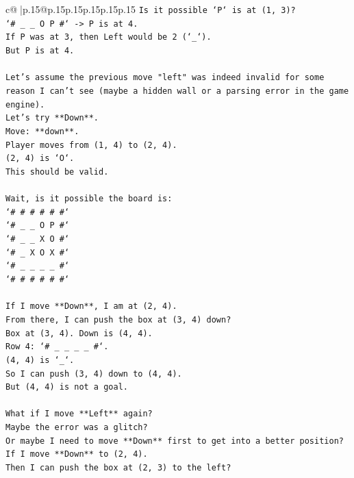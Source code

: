 \documentclass{article}
\begin{document}
{\begin{supertabular}{c@{$\;$}|p{.15\linewidth}@{}p{.15\linewidth}p{.15\linewidth}p{.15\linewidth}p{.15\linewidth}p{.15\linewidth}}
{{{\texttt{Is it possible `P` is at (1, 3)?} \\
\texttt{`\# \_ \_ O P \#` {-}> P is at 4.} \\
\texttt{If P was at 3, then Left would be 2 (`\_`).} \\
\texttt{But P is at 4.} \\
\\ 
\texttt{Let's assume the previous move "left" was indeed invalid for some reason I can't see (maybe a hidden wall or a parsing error in the game engine).} \\
\texttt{Let's try **Down**.} \\
\texttt{Move: **down**.} \\
\texttt{Player moves from (1, 4) to (2, 4).} \\
\texttt{(2, 4) is `O`.} \\
\texttt{This should be valid.} \\
\\ 
\texttt{Wait, is it possible the board is:} \\
\texttt{`\# \# \# \# \# \#`} \\
\texttt{`\# \_ \_ O P \#`} \\
\texttt{`\# \_ \_ X O \#`} \\
\texttt{`\# \_ X O X \#`} \\
\texttt{`\# \_ \_ \_ \_ \#`} \\
\texttt{`\# \# \# \# \# \#`} \\
\\ 
\texttt{If I move **Down**, I am at (2, 4).} \\
\texttt{From there, I can push the box at (3, 4) down?} \\
\texttt{Box at (3, 4). Down is (4, 4).} \\
\texttt{Row 4: `\# \_ \_ \_ \_ \#`.} \\
\texttt{(4, 4) is `\_`.} \\
\texttt{So I can push (3, 4) down to (4, 4).} \\
\texttt{But (4, 4) is not a goal.} \\
\\ 
\texttt{What if I move **Left** again?} \\
\texttt{Maybe the error was a glitch?} \\
\texttt{Or maybe I need to move **Down** first to get into a better position?} \\
\texttt{If I move **Down** to (2, 4).} \\
\texttt{Then I can push the box at (2, 3) to the left?} \\
}}}
\end{supertabular}}
\end{document}
